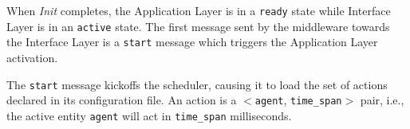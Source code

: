 
When \textit{Init} completes, the Application Layer is in a \verb|ready| state
while Interface Layer is in an \verb|active| state.
The first message sent by the middleware towards the Interface Layer is a
\verb|start| message which triggers the Application Layer activation.

The \verb|start| message kickoffs the scheduler, causing it to load the set
of actions declared in its configuration file. An action is a $<$\verb|agent|,
\verb|time_span|$>$ pair, i.e., the active entity \verb|agent| will act in
\verb|time_span| milliseconds.
